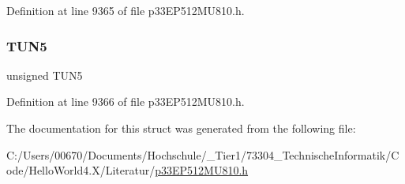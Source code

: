 Definition at line 9365 of file p33\+E\+P512\+M\+U810.\+h.

\mbox{\label{structtag_o_s_c_t_u_n_b_i_t_s_a310915f2163219d079f409e480fbb368}} 
\subsubsection{\texorpdfstring{T\+U\+N5}{TUN5}}
{\footnotesize\ttfamily unsigned T\+U\+N5}



Definition at line 9366 of file p33\+E\+P512\+M\+U810.\+h.



The documentation for this struct was generated from the following file\+:\begin{DoxyCompactItemize}
\item 
C\+:/\+Users/00670/\+Documents/\+Hochschule/\+\_\+\+Tier1/73304\+\_\+\+Technische\+Informatik/\+Code/\+Hello\+World4.\+X/\+Literatur/\hyperlink{p33_e_p512_m_u810_8h}{p33\+E\+P512\+M\+U810.\+h}\end{DoxyCompactItemize}
